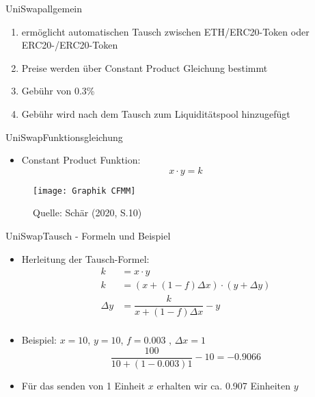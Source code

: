 \documentclass{beamer}
\begin{document}
\begin{frame}{UniSwap}{allgemein}
 \begin{enumerate}
    \item<1->{ermöglicht automatischen Tausch zwischen ETH/ERC20-Token oder ERC20-/ERC20-Token}
    \item<2->{Preise werden über Constant Product Gleichung bestimmt}
    \item<3->{Gebühr von 0.3\%}
    \item<4->{Gebühr wird nach dem Tausch zum Liquiditätspool hinzugefügt}
  \end{enumerate}
\end{frame}

\begin{frame}{UniSwap}{Funktionsgleichung}
\begin{itemize}
\item{Constant Product Funktion:
    \begin{equation}
    x \cdot y = k
    \end{equation} }
\end{itemize}
\begin{figure}
\texttt{[image: Graphik CFMM]}
\caption{\tiny{Quelle: Schär (2020, S.10)}}
\end{figure}
\end{frame}

\begin{frame}{UniSwap}{Tausch - Formeln und Beispiel}
\begin{itemize}
\item{Herleitung der Tausch-Formel:
	\begin{align*}
	k &= x\cdot y \\
	k &= (x+ (1-f)\Delta x) \cdot (y+\Delta y) \\
	\Delta y &= \dfrac{k}{x+ (1-f) \Delta x} - y \\
	\end{align*}}
\item{Beispiel: $x =10$,  $y=10$,  $f=0.003$ ,  $\Delta x = 1$ \\
	\begin{equation*}
	\dfrac{100}{10+(1-0.003)1}- 10 = -0.9066
	\end{equation*}}
 \item{Für das senden von 1 Einheit $x$ erhalten wir ca. 0.907 Einheiten $y$}
\end{itemize}
\end{frame}	
\end{document}
